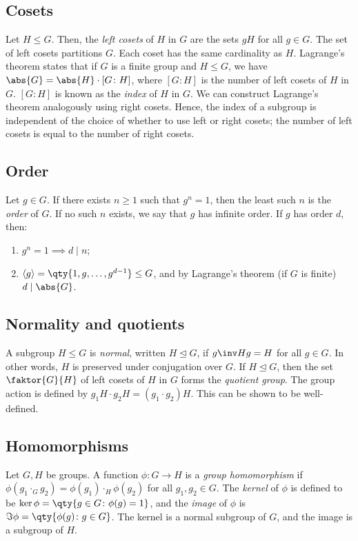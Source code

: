 \subsection{Cosets}
Let $H \leq G$.
Then, the \textit{left cosets} of $H$ in $G$ are the sets $gH$ for all $g \in G$.
The set of left cosets partitions $G$.
Each coset has the same cardinality as $H$.
Lagrange's theorem states that if $G$ is a finite group and $H \leq G$, we have $\abs{G} = \abs{H} \cdot [G \colon H]$, where $[G \colon H]$ is the number of left cosets of $H$ in $G$.
$[G \colon H]$ is known as the \textit{index} of $H$ in $G$.
We can construct Lagrange's theorem analogously using right cosets.
Hence, the index of a subgroup is independent of the choice of whether to use left or right cosets; the number of left cosets is equal to the number of right cosets.

\subsection{Order}
Let $g \in G$.
If there exists $n \geq 1$ such that $g^n = 1$, then the least such $n$ is the \textit{order} of $G$.
If no such $n$ exists, we say that $g$ has infinite order.
If $g$ has order $d$, then:
\begin{enumerate}
	\item $g^n = 1 \implies d \mid n$;
	\item $\genset{g} = \qty{1, g, \dots, g^{d-1}} \leq G$, and by Lagrange's theorem (if $G$ is finite) $d \mid \abs{G}$.
\end{enumerate}

\subsection{Normality and quotients}
A subgroup $H \leq G$ is \textit{normal}, written $H \trianglelefteq G$, if $g\inv H g = H$ for all $g \in G$.
In other words, $H$ is preserved under conjugation over $G$.
If $H \trianglelefteq G$, then the set $\faktor{G}{H}$ of left cosets of $H$ in $G$ forms the \textit{quotient group}.
The group action is defined by $g_1 H \cdot g_2 H = (g_1 \cdot g_2) H$.
This can be shown to be well-defined.

\subsection{Homomorphisms}
Let $G, H$ be groups.
A function $\phi \colon G \to H$ is a \textit{group homomorphism} if $\phi(g_1 \cdot_G g_2) = \phi(g_1) \cdot_H \phi(g_2)$ for all $g_1, g_2 \in G$.
The \textit{kernel} of $\phi$ is defined to be $\ker \phi = \qty{g \in G \colon \phi(g) = 1}$, and the \textit{image} of $\phi$ is $\Im \phi = \qty{\phi(g) \colon g \in G}$.
The kernel is a normal subgroup of $G$, and the image is a subgroup of $H$.

